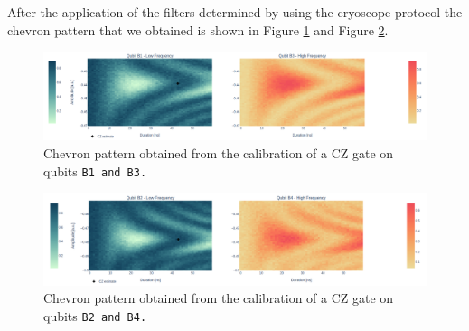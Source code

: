 After the application of the filters determined by using the cryoscope protocol the chevron pattern that we obtained is shown in Figure \ref{fig:B1B3} and Figure \ref{fig:B2B4}.

\begin{figure}[h!]
    \centering
    \includegraphics[width=\textwidth]{figures/png/Cryoscope/B1B3.png}
    \caption{Chevron pattern obtained from the calibration of a CZ gate on qubits \tt{B1} and \tt{B3}.}
    \label{fig:B1B3}
\end{figure}

\begin{figure}[h!]
    \centering
    \includegraphics[width=\textwidth]{figures/png/Cryoscope/B2B4.png}
    \caption{Chevron pattern obtained from the calibration of a CZ gate on qubits \tt{B2} and \tt{B4}.}
    \label{fig:B2B4}
\end{figure}

\newpage
\restoregeometry